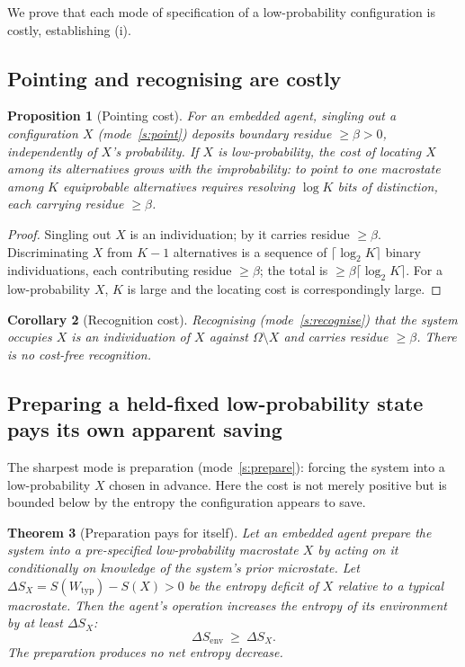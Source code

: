 \documentclass[11pt,a4paper]{article}
\theoremstyle{thmstyle}
\newtheorem{theorem}{Theorem}[section]
\newtheorem{proposition}[theorem]{Proposition}
\newtheorem{corollary}[theorem]{Corollary}
\theoremstyle{definition}
\theoremstyle{remark}
\newcommand{\Space}{\Omega}
\newcommand{\Wmac}{W}
\newcommand{\floorc}{\beta}
\begin{document}
We prove that each mode of specification of a low-probability configuration is
costly, establishing (i).

\subsection{Pointing and recognising are costly}

\begin{proposition}[Pointing cost]
\label{prop:point-cost}
For an embedded agent, singling out a configuration $X$ (mode~\ref{s:point})
deposits boundary residue $\ge\floorc>0$, independently of $X$'s probability. If
$X$ is low-probability, the cost of \emph{locating} $X$ among its alternatives
grows with the improbability: to point to one macrostate among $K$ equiprobable
alternatives requires resolving $\log K$ bits of distinction, each carrying
residue $\ge\floorc$.
\end{proposition}

\begin{proof}
Singling out $X$ is an individuation; by  it carries residue
$\ge\floorc$. Discriminating $X$ from $K-1$ alternatives is a sequence of
$\lceil\log_2 K\rceil$ binary individuations, each contributing residue
$\ge\floorc$; the total is $\ge\floorc\lceil\log_2 K\rceil$. For a
low-probability $X$, $K$ is large and the locating cost is correspondingly
large.
\end{proof}

\begin{corollary}[Recognition cost]
\label{cor:recog-cost}
Recognising (mode~\ref{s:recognise}) that the system occupies $X$ is an
individuation of $X$ against $\Space\setminus X$ and carries residue
$\ge\floorc$. There is no cost-free recognition.
\end{corollary}

\subsection{Preparing a held-fixed low-probability state pays its own apparent saving}

The sharpest mode is preparation (mode~\ref{s:prepare}): forcing the system into
a low-probability $X$ chosen in advance. Here the cost is not merely positive but
is bounded below by the entropy the configuration appears to save.

\begin{theorem}[Preparation pays for itself]
\label{thm:landauer}
Let an embedded agent prepare the system into a pre-specified low-probability
macrostate $X$ by acting on it conditionally on knowledge of the system's prior
microstate. Let $\Delta S_X=S(\Wmac_{\mathrm{typ}})-S(X)>0$ be the entropy
deficit of $X$ relative to a typical macrostate. Then the agent's operation
increases the entropy of its environment by at least $\Delta S_X$:
\[
\Delta S_{\mathrm{env}}\ \ge\ \Delta S_X .
\]
The preparation produces no net entropy decrease.
\end{theorem}
\end{document}
